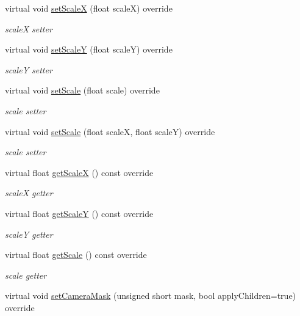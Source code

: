 \begin{DoxyCompactItemize}
\item 
virtual void \hyperlink{classui_1_1Scale9Sprite_a7f9db0e954aca485c0d37a665927881c}{set\+ScaleX} (float scaleX) override
\begin{DoxyCompactList}\small\item\em scaleX setter \end{DoxyCompactList}\item 
virtual void \hyperlink{classui_1_1Scale9Sprite_a7c108e20a3b0b479258447335531bfe2}{set\+ScaleY} (float scaleY) override
\begin{DoxyCompactList}\small\item\em scaleY setter \end{DoxyCompactList}\item 
virtual void \hyperlink{classui_1_1Scale9Sprite_a6824394dc8d5f26668b5e6f8b3cae3ba}{set\+Scale} (float scale) override
\begin{DoxyCompactList}\small\item\em scale setter \end{DoxyCompactList}\item 
virtual void \hyperlink{classui_1_1Scale9Sprite_a5c98e355992ab8f4e4cfc2f4eac8e104}{set\+Scale} (float scaleX, float scaleY) override
\begin{DoxyCompactList}\small\item\em scale setter \end{DoxyCompactList}\item 
virtual float \hyperlink{classui_1_1Scale9Sprite_a3aaed8de223156f4567a4b59e208e66d}{get\+ScaleX} () const override
\begin{DoxyCompactList}\small\item\em scaleX getter \end{DoxyCompactList}\item 
virtual float \hyperlink{classui_1_1Scale9Sprite_a7bab472ed47f8eb5d061120915f9c2d7}{get\+ScaleY} () const override
\begin{DoxyCompactList}\small\item\em scaleY getter \end{DoxyCompactList}\item 
virtual float \hyperlink{classui_1_1Scale9Sprite_a83a48c3e969e9ae2d0d4bca560159bff}{get\+Scale} () const override
\begin{DoxyCompactList}\small\item\em scale getter \end{DoxyCompactList}\item 
virtual void \hyperlink{classui_1_1Scale9Sprite_ab871c3756134c9f991876cd78ae1ef03}{set\+Camera\+Mask} (unsigned short mask, bool apply\+Children=true) override

\end{DoxyCompactItemize}
